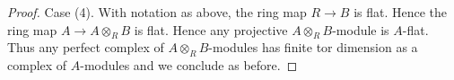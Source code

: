 \documentclass{stacks-project}
\theoremstyle{plain}
\theoremstyle{definition}
\theoremstyle{remark}
\numberwithin{equation}{subsection}
\begin{document}
\begin{proof}
\medskip\noindent
Case (4). With notation as above, the ring map $R \to B$ is flat.
Hence the ring map $A \to A \otimes_R B$ is flat. Hence any projective
$A \otimes_R B$-module is $A$-flat. Thus any perfect complex of
$A \otimes_R B$-modules has finite tor dimension as a complex
of $A$-modules and we conclude as before.
\end{proof}
\end{document}
